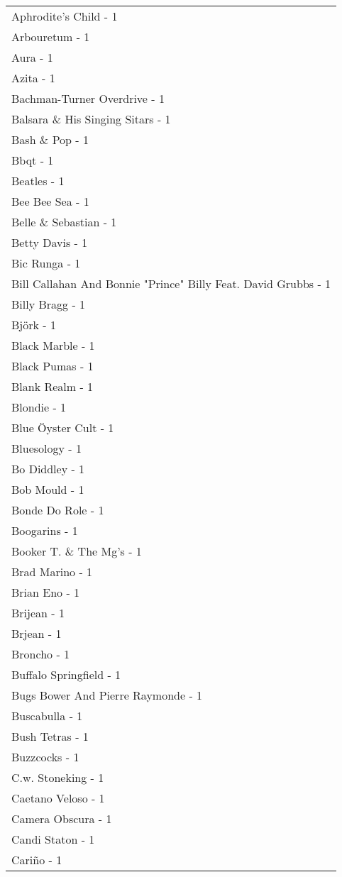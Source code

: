 \documentclass[
]{article}
\begin{document}
\begin{longtable}{l}
Aphrodite's Child - 1 \\ 
Arbouretum - 1 \\ 
Aura - 1 \\ 
Azita - 1 \\ 
Bachman-Turner Overdrive - 1 \\ 
Balsara \& His Singing Sitars - 1 \\ 
Bash \& Pop - 1 \\ 
Bbqt - 1 \\ 
Beatles - 1 \\ 
Bee Bee Sea - 1 \\ 
Belle \& Sebastian - 1 \\ 
Betty Davis - 1 \\ 
Bic Runga - 1 \\ 
Bill Callahan And Bonnie "Prince" Billy Feat. David Grubbs - 1 \\ 
Billy Bragg - 1 \\ 
Björk - 1 \\ 
Black Marble - 1 \\ 
Black Pumas - 1 \\ 
Blank Realm - 1 \\ 
Blondie - 1 \\ 
Blue Öyster Cult - 1 \\ 
Bluesology - 1 \\ 
Bo Diddley - 1 \\ 
Bob Mould - 1 \\ 
Bonde Do Role - 1 \\ 
Boogarins - 1 \\ 
Booker T. \& The Mg's - 1 \\ 
Brad Marino - 1 \\ 
Brian Eno - 1 \\ 
Brijean - 1 \\ 
Brjean - 1 \\ 
Broncho - 1 \\ 
Buffalo Springfield - 1 \\ 
Bugs Bower And Pierre Raymonde - 1 \\ 
Buscabulla - 1 \\ 
Bush Tetras - 1 \\ 
Buzzcocks - 1 \\ 
C.w. Stoneking - 1 \\ 
Caetano Veloso - 1 \\ 
Camera Obscura - 1 \\ 
Candi Staton - 1 \\ 
Cariño - 1 \\ 

\end{longtable}
\end{document}
